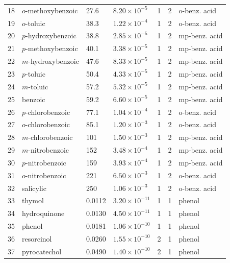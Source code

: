 \begin{longtable}{r l l l c c l}
18 & {$o$-methoxybenzoic}       & 27.6    & $8.20 \times 10^{-5}  $ & 1 & 2 & o-benz. acid \\
19 & {$o$-toluic}               & 38.3    & $1.22 \times 10^{-4}  $ & 1 & 2 & o-benz. acid \\
20 & {$p$-hydroxybenzoic}       & 38.8    & $2.85 \times 10^{-5}  $ & 1 & 2 & mp-benz. acid \\
21 & {$p$-methoxybenzoic}       & 40.1    & $3.38 \times 10^{-5}  $ & 1 & 2 & mp-benz. acid \\
22 & {$m$-hydroxybenzoic}       & 47.6    & $8.33 \times 10^{-5}  $ & 1 & 2 & mp-benz. acid \\
23 & {$p$-toluic}               & 50.4    & $4.33 \times 10^{-5}  $ & 1 & 2 & mp-benz. acid \\
24 & {$m$-toluic}               & 57.2    & $5.32 \times 10^{-5}  $ & 1 & 2 & mp-benz. acid \\
25 & {benzoic}                  & 59.2    & $6.60 \times 10^{-5}  $ & 1 & 2 & mp-benz. acid \\
26 & {$p$-chlorobenzoic}        & 77.1    & $1.04 \times 10^{-4}  $ & 1 & 2 & o-benz. acid \\
27 & {$o$-chlorobenzoic}        & 85.1    & $1.20 \times 10^{-3}  $ & 1 & 2 & o-benz. acid \\
28 & {$m$-chlorobenzoic}        & 101     & $1.50 \times 10^{-3}  $ & 1 & 2 & mp-benz. acid \\
29 & {$m$-nitrobenzoic}         & 152     & $3.48 \times 10^{-4}  $ & 1 & 2 & mp-benz. acid \\
30 & {$p$-nitrobenzoic}         & 159     & $3.93 \times 10^{-4}  $ & 1 & 2 & mp-benz. acid \\
31 & {$o$-nitrobenzoic}         & 221     & $6.50 \times 10^{-3}  $ & 1 & 2 & o-benz. acid \\
32 & {salicylic}                & 250     & $1.06 \times 10^{-3}  $ & 1 & 2 & o-benz. acid \\
33 & {thymol}                   & 0.0112  & $3.20 \times 10^{-11} $ & 1 & 1 & phenol \\
34 & {hydroquinone}             & 0.0130  & $4.50 \times 10^{-11} $ & 1 & 1 & phenol \\
35 & {phenol}                   & 0.0181  & $1.06 \times 10^{-10} $ & 1 & 1 & phenol \\
36 & {resorcinol}               & 0.0260  & $1.55 \times 10^{-10} $ & 2 & 1 & phenol \\
37 & {pyrocatechol}             & 0.0490  & $1.40 \times 10^{-10} $ & 2 & 1 & phenol \\

\end{longtable}
